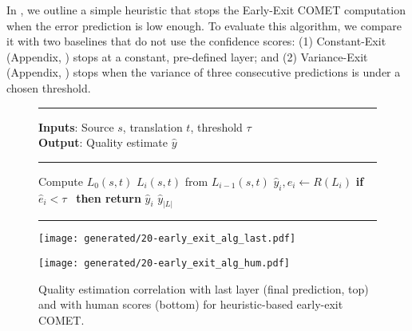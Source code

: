 In , we outline a simple heuristic that stops the Early-Exit COMET computation when the error prediction is low enough.
To evaluate this algorithm, we compare it with two baselines that do not use the confidence scores: (1) Constant-Exit (Appendix, ) stops at a constant, pre-defined layer; and (2) Variance-Exit (Appendix, ) stops when the variance of three consecutive predictions is under a chosen threshold.

\begin{figure}[t]
{
\small
\hrule
\vspace{1mm}
\textbf{Inputs}: Source $s$, translation $t$, threshold $\tau$ \\
\textbf{Output}: Quality estimate $\hat{y}$ 
\vspace{1mm}
\hrule
\vspace{1mm}
\begin{algorithmic}[1]

\State Compute $L_0(s, t)$
    $L_i(s,t)$ from $L_{i-1}(s,t)$ 
    \State $\hat{y}_i, \hat{e}_i \gets R(L_i)$ 
    \State \textbf{if} \, $\hat{e}_i < \tau$ \, \textbf{then return} $\hat{y}_i$
\EndFor
\State \Return  $\hat{y}_{|L|}$ 
\end{algorithmic}
}
\vspace{1mm}
\hrule
\vspace{1mm}

\label{alg:threshold_algorithm}
\vspace{-2mm}
\end{figure}

\begin{figure}[t]
    \centering
    \texttt{[image: generated/20-early\_exit\_alg\_last.pdf]}

    \vspace{-3.2mm}
    \texttt{[image: generated/20-early\_exit\_alg\_hum.pdf]}

    \vspace{-2mm}
    \caption{
    Quality estimation correlation with last layer (final prediction, top) and with human scores (bottom) for heuristic-based early-exit COMET.
    }
    \label{fig:20-early_exit_alg}
    \vspace{-2mm}
\end{figure}



